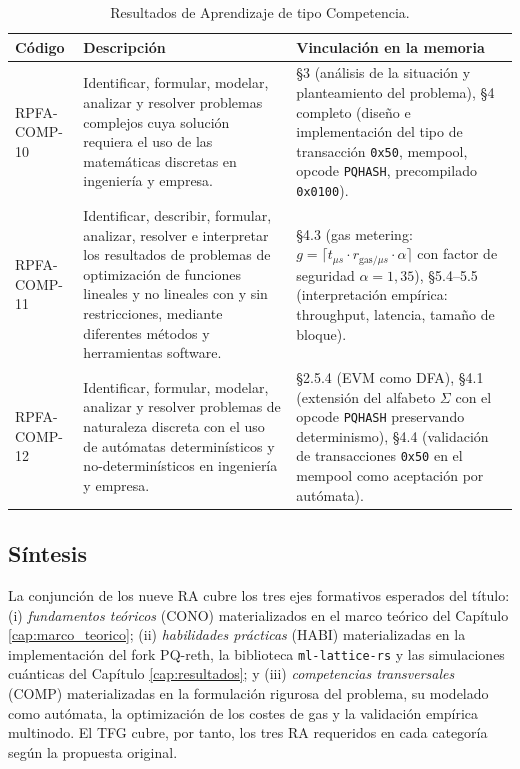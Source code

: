 \begin{table}[htbp]
\centering
\caption{Resultados de Aprendizaje de tipo Competencia.}
\label{tab:ra_comp}
\renewcommand{\arraystretch}{1.35}
\begin{tabular}{@{}>{\raggedright\arraybackslash}p{2.6cm}>{\raggedright\arraybackslash}p{5.8cm}>{\raggedright\arraybackslash}p{6.2cm}@{}}
\toprule
\textbf{Código} & \textbf{Descripción} & \textbf{Vinculación en la memoria} \\
\midrule
RPFA-COMP-10 & Identificar, formular, modelar, analizar y resolver problemas complejos cuya solución requiera el uso de las matemáticas discretas en ingeniería y empresa. & §3 (análisis de la situación y planteamiento del problema), §4 completo (diseño e implementación del tipo de transacción \texttt{0x50}, mempool, opcode \texttt{PQHASH}, precompilado \texttt{0x0100}). \\
\addlinespace
RPFA-COMP-11 & Identificar, describir, formular, analizar, resolver e interpretar los resultados de problemas de optimización de funciones lineales y no lineales con y sin restricciones, mediante diferentes métodos y herramientas software. & §4.3 (gas metering: $g = \lceil t_{\mu s} \cdot r_{\text{gas}/\mu s} \cdot \alpha \rceil$ con factor de seguridad $\alpha = 1{,}35$), §5.4--5.5 (interpretación empírica: throughput, latencia, tamaño de bloque). \\
\addlinespace
RPFA-COMP-12 & Identificar, formular, modelar, analizar y resolver problemas de naturaleza discreta con el uso de autómatas determinísticos y no-determinísticos en ingeniería y empresa. & §2.5.4 (EVM como DFA), §4.1 (extensión del alfabeto $\Sigma$ con el opcode \texttt{PQHASH} preservando determinismo), §4.4 (validación de transacciones \texttt{0x50} en el mempool como aceptación por autómata). \\
\bottomrule
\end{tabular}
\end{table}

\subsection*{Síntesis}

La conjunción de los nueve RA cubre los tres ejes formativos esperados del título: (i) \emph{fundamentos teóricos} (CONO) materializados en el marco teórico del Capítulo \ref{cap:marco_teorico}; (ii) \emph{habilidades prácticas} (HABI) materializadas en la implementación del fork PQ-reth, la biblioteca \texttt{ml-lattice-rs} y las simulaciones cuánticas del Capítulo \ref{cap:resultados}; y (iii) \emph{competencias transversales} (COMP) materializadas en la formulación rigurosa del problema, su modelado como autómata, la optimización de los costes de gas y la validación empírica multinodo. El TFG cubre, por tanto, los tres RA requeridos en cada categoría según la propuesta original.
